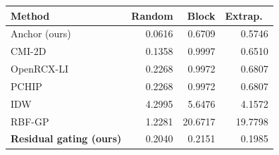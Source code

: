 \small
\begin{tabular}{lrrr}\toprule
Method & Random & Block & Extrap.\ \\\midrule
Anchor (ours) & 0.0616 & 0.6709 & 0.5746 \\
CMI-2D & 0.1358 & 0.9997 & 0.6510 \\
OpenRCX-LI & 0.2268 & 0.9972 & 0.6807 \\
PCHIP & 0.2268 & 0.9972 & 0.6807 \\
IDW & 4.2995 & 5.6476 & 4.1572 \\
RBF-GP & 1.2281 & 20.6717 & 19.7798 \\
\textbf{Residual gating (ours)} & 0.2040 & 0.2151 & 0.1985 \\
\bottomrule\end{tabular}
